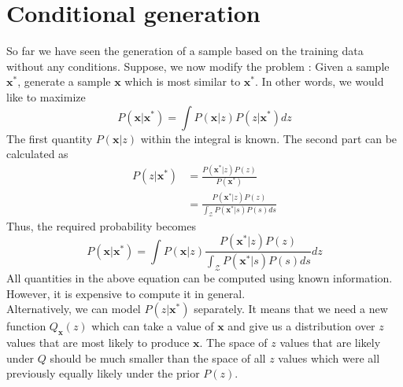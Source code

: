 \documentclass[12pt]{article}
\begin{document}
\section{Conditional generation}
So far we have seen the generation of a sample based on the training data without any conditions. Suppose, we now modify the problem : Given a sample $\mathbf{x^{*}}$, generate a sample $\mathbf{x}$ which is most similar to $\mathbf{x^{*}}$. In other words, we would like to maximize
\begin{equation*}
    P(\mathbf{x|x^{*}}) = \int{P(\mathbf{x}|z)P(z|\mathbf{x^{*}})dz}
\end{equation*}
The first quantity $P(\mathbf{x}|z)$ within the integral is known. The second part can be calculated as
\begin{align*}
    P(z|\mathbf{x^{*}}) &= \frac{P(\mathbf{x^{*}}|z)P(z)}{P(\mathbf{x^{*}})}\\
                        &= \frac{P(\mathbf{x^{*}}|z)P(z)}{\int_{\mathcal{Z}}{P(\mathbf{x^{*}}|s)P(s)ds}}
\end{align*}
Thus, the required probability becomes
\begin{equation*}
    P(\mathbf{x}|\mathbf{x^{*}}) = \int{P(\mathbf{x}|z)\frac{P(\mathbf{x^{*}}|z)P(z)}{\int_{\mathcal{Z}}{P(\mathbf{x^{*}}|s)P(s)ds}}dz}
\end{equation*}
All quantities in the above equation can be computed using known information. However, it is expensive to compute it in general.\\
Alternatively, we can model $P(z|\mathbf{x^{*}})$ separately. It means that we need a new function $Q_{\mathbf{x}}(z)$ which can take a value of $\mathbf{x}$ and give us a distribution over $z$ values that are most likely to produce $\mathbf{x}$. The space of $z$ values that are likely under $Q$ should be much smaller than the space of all $z$ values which were all previously equally likely under the prior $P(z)$. 
\end{document}
